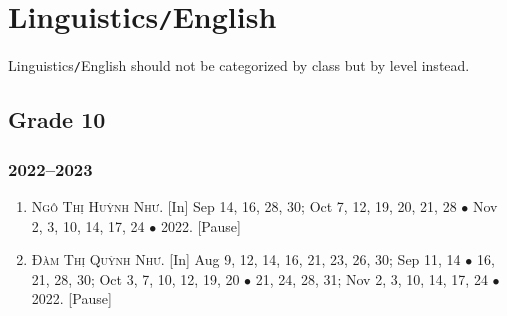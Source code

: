 \documentclass{article}
\begin{document}

\section{Linguistics\texttt{/}English}
Linguistics\texttt{/}English should not be categorized by class but by level instead.

\subsection{Grade 10}

\subsubsection{2022--2023}

\begin{enumerate}
	\item \textsc{Ngô Thị Huỳnh Như.} \textsf{[In]} Sep 14, 16, 28, 30; Oct 7, 12, 19, 20, 21, 28 $\bullet$ Nov 2, 3, 10, 14, 17, 24 $\bullet$ 2022. \textsf{[Pause]}
	\item \textsc{Đàm Thị Quỳnh Như.} \textsf{[In]} Aug 9, 12, 14, 16, 21, 23, 26, 30; Sep 11, 14 $\bullet$ 16, 21, 28, 30; Oct 3, 7, 10, 12, 19, 20 $\bullet$ 21, 24, 28, 31; Nov 2, 3, 10, 14, 17, 24 $\bullet$ 2022. \textsf{[Pause]}
\end{enumerate}


\printbibliography[heading=bibintoc]
	
\end{document}
